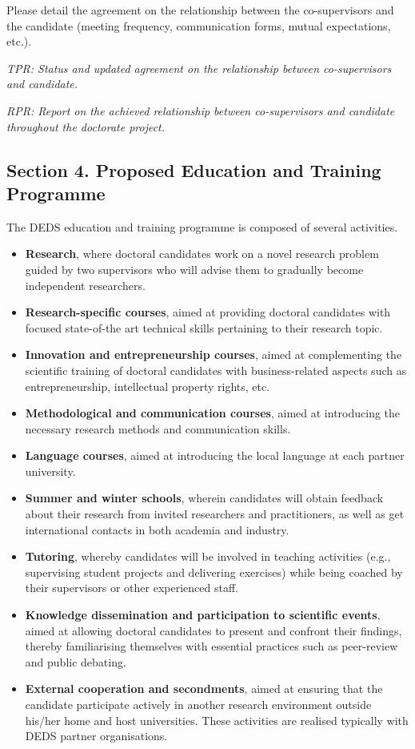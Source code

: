 \documentclass[12pt]{article}
\begin{document}
Please detail the agreement on the relationship between the co-supervisors and the candidate (meeting frequency, communication forms, mutual expectations, etc.).

\begin{shaded}
\noindent
\emph{TPR: Status and updated agreement on the relationship between co-supervisors and candidate.}

\noindent
\emph{RPR: Report on the achieved relationship between co-supervisors and candidate throughout the doctorate project.}
\end{shaded}

\subsection*{Section 4. Proposed Education and Training Programme}

The DEDS education and training programme is composed of several activities.
\begin{itemize}
\item \textbf{Research}, where doctoral candidates work on a novel research problem 
guided by two supervisors who will advise them to gradually become independent researchers.
\item \textbf{Research-specific courses}, aimed at providing doctoral candidates with focused
state-of-the art technical skills pertaining to their research topic.
\item \textbf{Innovation and entrepreneurship courses}, aimed at complementing the scientific training
of doctoral candidates with business-related aspects such as entrepreneurship,
intellectual property rights, etc.
\item \textbf{Methodological and communication courses}, aimed at introducing the necessary
research methods and communication skills.
\item \textbf{Language courses}, aimed at introducing the local language at each partner university.
\item \textbf{Summer and winter schools}, wherein candidates will obtain 
feedback about their research from invited researchers and practitioners,
as well as get international contacts in both academia and industry.
\item \textbf{Tutoring}, whereby candidates will be involved in teaching activities
(e.g., supervising student projects and delivering exercises) 
while being coached by their supervisors or other experienced staff.
\item \textbf{Knowledge dissemination and participation to scientific events}, aimed at allowing
doctoral candidates to present and confront their findings, thereby familiarising
themselves with essential practices such as peer-review and public debating.
\item \textbf{External cooperation and secondments}, aimed at ensuring that the candidate
participate actively in another research environment outside his/her home and host universities.
These activities are realised typically with DEDS partner organisations.
\end{itemize}
\end{document}
